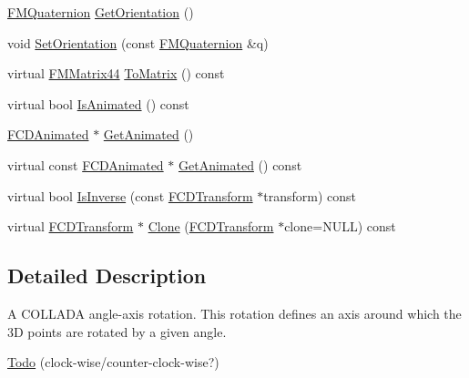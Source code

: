 \begin{DoxyCompactItemize}
\item 
\hyperlink{classFMQuaternion}{FMQuaternion} \hyperlink{classFCDTRotation_a6371e350942c3efa33ac7b3ccd253b42}{GetOrientation} ()
\item 
void \hyperlink{classFCDTRotation_ab28cabb379c6312e4a5fae609f33dea8}{SetOrientation} (const \hyperlink{classFMQuaternion}{FMQuaternion} \&q)
\item 
virtual \hyperlink{classFMMatrix44}{FMMatrix44} \hyperlink{classFCDTRotation_a928ca46c14e83d7efcf840ce3f1452fe}{ToMatrix} () const 
\item 
virtual bool \hyperlink{classFCDTRotation_aeb5dc80fb81f11f0fe024f925961c7d9}{IsAnimated} () const 
\item 
\hyperlink{classFCDAnimated}{FCDAnimated} $\ast$ \hyperlink{classFCDTRotation_a749761125dbd6f71268696d42ee39450}{GetAnimated} ()
\item 
virtual const \hyperlink{classFCDAnimated}{FCDAnimated} $\ast$ \hyperlink{classFCDTRotation_aa15d71e8f12a80fba90bc788c3e26826}{GetAnimated} () const 
\item 
virtual bool \hyperlink{classFCDTRotation_a2b5c4b3edef9384c4fa20be5591874a2}{IsInverse} (const \hyperlink{classFCDTransform}{FCDTransform} $\ast$transform) const 
\item 
virtual \hyperlink{classFCDTransform}{FCDTransform} $\ast$ \hyperlink{classFCDTRotation_a7b4de1344e7b0e1f930b3bad6f1ae169}{Clone} (\hyperlink{classFCDTransform}{FCDTransform} $\ast$clone=NULL) const 
\end{DoxyCompactItemize}


\subsection{Detailed Description}
A COLLADA angle-\/axis rotation. This rotation defines an axis around which the 3D points are rotated by a given angle. \begin{Desc}
\item[\hyperlink{todo__todo000010}{Todo}](clock-\/wise/counter-\/clock-\/wise?)\end{Desc}


